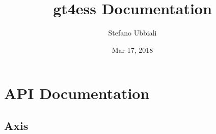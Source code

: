 \documentclass[letterpaper,10pt,english]{sphinxmanual}
\title{gt4ess Documentation}
\date{Mar 17, 2018}
\author{Stefano Ubbiali}
\begin{document}
\maketitle
\sphinxtableofcontents
{}\label{\detokenize{index::doc}}



\chapter{API Documentation}
\label{\detokenize{api:welcome-to-gt4ess-s-documentation}}\label{\detokenize{api::doc}}\label{\detokenize{api:api-documentation}}

\section{Axis}
\label{\detokenize{api:axis}}
\end{document}
